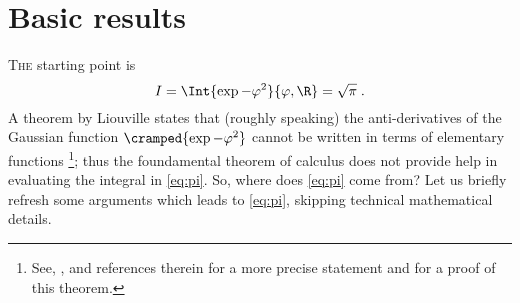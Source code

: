 
\section{Basic results}

\lettrine{T}{he} starting point  is 
\begin{equation}\label{eq:pi}
I = \Int{\exp{-\varphi^{2}}}{\varphi,\R} = \sqrt{\pi}  
\; .
\end{equation}
A theorem by Liouville states that (roughly speaking) the anti-derivatives of the Gaussian function
$\cramped{\exp{-\varphi^{2}}}$ cannot be written in terms of elementary functions%
\footnote{See, \eg, \textcite{Boros.Moll:2004} and references therein for a
   more precise statement and for a proof of this theorem.};
thus the foundamental theorem of calculus does not provide help in evaluating the integral in
\cref{eq:pi}. So, where does \cref{eq:pi} come from?
Let us briefly refresh some arguments which leads to
\cref{eq:pi}, skipping technical mathematical details.

